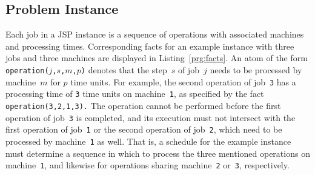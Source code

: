 \documentclass{tlp} %
\begin{document}
\subsection{Problem Instance}\label{subsec:instance}
% 
%
Each job in a JSP instance is a sequence of operations with associated
machines and processing times.
Corresponding facts for an example instance with three jobs and three
machines are displayed in Listing~\ref{prg:facts}.
An atom of the form
\lstinline{operation(}$j$\lstinline{,}$s$\lstinline{,}$m$\lstinline{,}$p$\lstinline{)}
denotes that the step~$s$ of job~$j$ needs to be processed by machine~$m$ for $p$ time units.
For example, the second operation of job~\lstinline{3} has a processing time of
\lstinline{3} time units on machine~\lstinline{1},
as specified by the fact
\lstinline{operation(3,}\linebreak[1]\lstinline{2,}\linebreak[1]\lstinline{1,3).}
The operation cannot be performed before the first operation of job~\lstinline{3}
is completed,
and its execution must not intersect with the first operation of job~\lstinline{1}
or the second operation of job~\lstinline{2},
which need to be processed by machine~\lstinline{1} as well.
That is, a schedule for the example instance must determine a sequence in which
to process the three mentioned operations on machine~\lstinline{1},
and likewise for operations sharing machine~\lstinline{2} or~\lstinline{3}, respectively.
%
\end{document}
